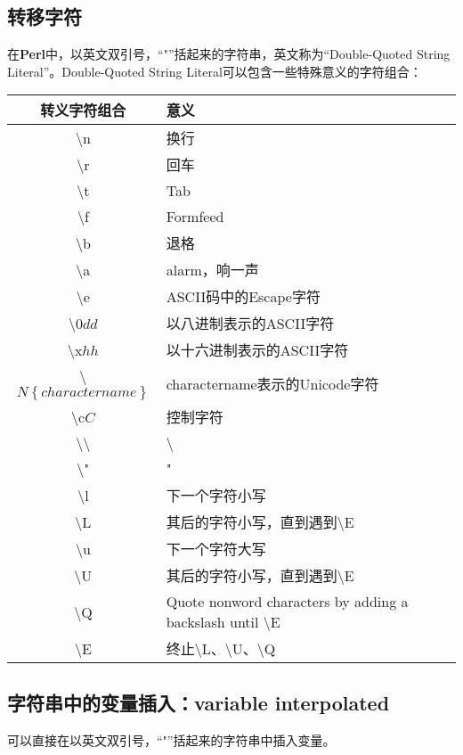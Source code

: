 \documentclass[11pt]{book}
\newcommand{\programminglanguage}[1]{\textbf{#1}}
\begin{document}
		\subsection{转移字符}
			在\programminglanguage{Perl}中，以英文双引号，“"”括起来的字符串，英文称为“Double-Quoted String Literal”。Double-Quoted String Literal可以包含一些特殊意义的字符组合：
			\begin{tabular}{|c|l|}
				\hline
				转义字符组合 & 意义 \\
				\hline
				\textbackslash n & 换行 \\
				\hline
				\textbackslash r & 回车 \\
				\hline
				\textbackslash t & Tab\\
				\hline
				\textbackslash f & Formfeed \\
				\hline
				\textbackslash b & 退格 \\
				\hline
				\textbackslash a & alarm，响一声 \\
				\hline
				\textbackslash e & ASCII码中的Escape字符 \\
				\hline
				\textbackslash 0$ dd $ & 以八进制表示的ASCII字符 \\
				\hline
				\textbackslash x$ hh $ & 以十六进制表示的ASCII字符 \\
				\hline
				\textbackslash $ N \left\lbrace charactername \right\rbrace $ & charactername表示的Unicode字符 \\
				\hline
				\textbackslash c$ C $ & 控制字符 \\
				\hline
				\textbackslash\textbackslash & \textbackslash \\
				\hline
				\textbackslash " & " \\
				\hline
				\textbackslash l & 下一个字符小写 \\
				\hline
				\textbackslash L & 其后的字符小写，直到遇到\textbackslash E \\
				\hline
				\textbackslash u & 下一个字符大写 \\
				\hline
				\textbackslash U & 其后的字符小写，直到遇到\textbackslash E \\
				\hline
				\textbackslash Q & Quote nonword characters by adding a backslash until \textbackslash E \\
				\hline
				\textbackslash E & 终止\textbackslash L、\textbackslash U、\textbackslash Q \\
				\hline
			\end{tabular}
			\subsection{字符串中的变量插入：variable interpolated}
				可以直接在以英文双引号，“"”括起来的字符串中插入变量。
				
\end{document}
